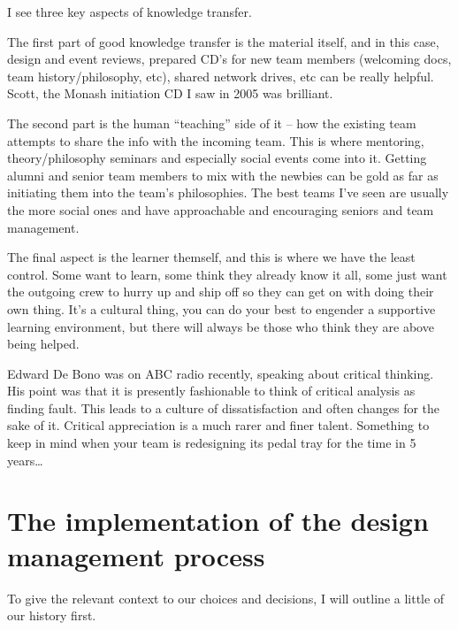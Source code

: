 \documentclass[10pt, a4paper, article, oneside, twocolumn, final]{memoir}
\begin{document}
I see three key aspects of knowledge transfer.

The first part of good knowledge transfer is the material itself, and in this case, design and event reviews, prepared CD's for new team members (welcoming docs, team history/\allowbreak philosophy, etc), shared network drives, etc can be really helpful. Scott, the Monash initiation CD I saw in 2005 was brilliant. 

The second part is the human “teaching” side of it -- how the existing team attempts to share the info with the incoming team. This is where mentoring, theory/\allowbreak philosophy seminars and especially social events come into it. Getting alumni and senior team members to mix with the newbies can be gold as far as initiating them into the team's philosophies. The best teams I've seen are usually the more social ones and have approachable and encouraging seniors and team management. 

The final aspect is the learner themself, and this is where we have the least control. Some want to learn, some think they already know it all, some just want the outgoing crew to hurry up and ship off so they can get on with doing their own thing. It's a cultural thing, you can do your best to engender a supportive learning environment, but there will always be those who think they are above being helped. 

Edward De Bono was on ABC radio recently, speaking about critical thinking. His point was that it is presently fashionable to think of critical analysis as finding fault. This leads to a culture of dissatisfaction and often changes for the sake of it. Critical appreciation is a much rarer and finer talent. Something to keep in mind when your team is redesigning its pedal tray for the  time in \num{5} years\ldots 



\chapter*{The implementation of the design management process}

To give the relevant context to our choices and decisions, I will outline a little of our history first. 
\end{document}
